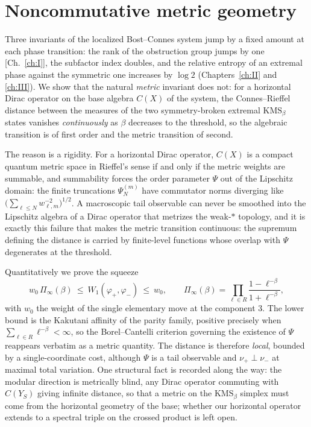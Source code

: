 \chapter[Noncommutative metric geometry]{Noncommutative metric geometry}\label{ch:IV}
\begin{summary}
Three invariants of the localized Bost--Connes system jump by a fixed amount at each phase
transition: the rank of the obstruction group jumps by one [Ch.~\ref{ch:I}], the
subfactor index doubles, and the relative entropy of an extremal phase against the
symmetric one increases by $\log2$ (Chapters~\ref{ch:II} and \ref{ch:III}). We show that the
natural \emph{metric} invariant does not: for a horizontal Dirac operator on the base
algebra $C(X)$ of the system, the Connes--Rieffel distance between the measures of the two
symmetry-broken extremal $\mathrm{KMS}_\beta$ states vanishes \emph{continuously} as $\beta$
decreases to the threshold, so the algebraic transition is of first order and the metric
transition of second.

The reason is a rigidity. For a horizontal Dirac operator, $C(X)$ is a compact quantum
metric space in Rieffel's sense if and only if the metric weights are summable, and
summability forces the order parameter $\Psi$ out of the Lipschitz domain: the finite
truncations $\Psi^{(m)}_N$ have commutator norms diverging like
$\bigl(\sum_{\ell\le N}w_{\ell,m}^{-2}\bigr)^{1/2}$. A macroscopic tail observable can never
be smoothed into the Lipschitz algebra of a Dirac operator that metrizes the weak-$*$
topology, and it is exactly this failure that makes the metric transition continuous: the
supremum defining the distance is carried by finite-level functions whose overlap with
$\Psi$ degenerates at the threshold.

Quantitatively we prove the squeeze
\[
w_0\,\Pi_\infty(\beta)\ \le\ W_1(\varphi_+,\varphi_-)\ \le\ w_0,
\qquad
\Pi_\infty(\beta)=\prod_{\ell\in R}\frac{1-\ell^{-\beta}}{1+\ell^{-\beta}},
\]
with $w_0$ the weight of the single elementary move at the component $3$. The lower bound is
the Kakutani affinity of the parity family, positive precisely when
$\sum_{\ell\in R}\ell^{-\beta}<\infty$, so the Borel--Cantelli criterion governing the
existence of $\Psi$ reappears verbatim as a metric quantity. The distance is therefore
\emph{local}, bounded by a single-coordinate cost, although $\Psi$ is a tail observable and
$\nu_+\perp\nu_-$ at maximal total variation. One structural fact is recorded along the
way: the modular direction is metrically blind, any Dirac operator commuting with $C(Y_S)$
giving infinite distance, so that a metric on the $\mathrm{KMS}_\beta$ simplex must come
from the horizontal geometry of the base; whether our horizontal operator extends to a
spectral triple on the crossed product is left open.
\end{summary}


